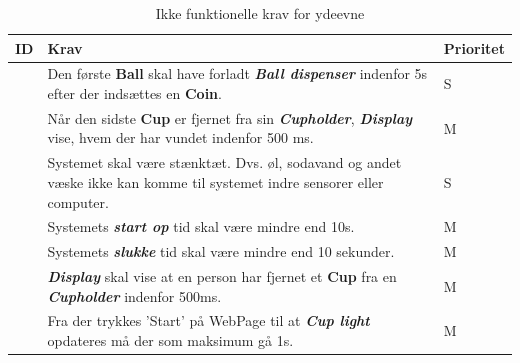 \documentclass[Kravspecifikation/Kravspec_Main.tex]{subfiles}
\begin{document}
\begin{table}[H]
\centering
\begin{tabular}{|L{0.1\textwidth}|L{0.65\textwidth}|L{0.15\textwidth}|}
\hline
\textbf{ID} & \textbf{Krav} & \textbf{Prioritet} \\ \hline
\subreq{} \label{req:ball-response-time} & Den første \textbf{Ball} skal have forladt \textit{\textbf{Ball dispenser}} indenfor 5s efter der indsættes en \textbf{Coin}. &  S\\ \hline
\subreq{} \label{req:won-response-time} & Når den sidste \textbf{Cup} er fjernet fra sin \textbf{\textit{Cupholder}}, \textbf{\textit{Display}} vise, hvem der har vundet indenfor 500 ms. &  M\\ \hline
\subreq{} \label{req:waterproof} & Systemet skal være stænktæt. Dvs. øl, sodavand og andet væske ikke kan komme til systemet indre sensorer eller computer. &  S\\ \hline

\subreq{} \label{req:startup-turnon-time} & Systemets \textbf{\textit{start op}} tid skal være mindre end 10s. & M \\ \hline
\subreq{} \label{req:startup-turnoff-time} & Systemets \textbf{\textit{slukke}} tid skal være mindre end 10 sekunder. & M \\ \hline
\subreq{} \label{req:remove-cup-response-time} & \textit{\textbf{Display}} skal vise at en person har fjernet et \textbf{Cup} fra en \textit{\textbf{Cupholder}} indenfor 500ms. & M \\ \hline
\subreq{} \label{req:max-start-time} & Fra der trykkes 'Start' på WebPage til at \textbf{\textit{Cup light}} opdateres må der som maksimum gå 1s. &  M\\ \hline
\end{tabular}
\caption{Ikke funktionelle krav for ydeevne}
\label{tab:ydeevne}
\end{table}
\end{document}
